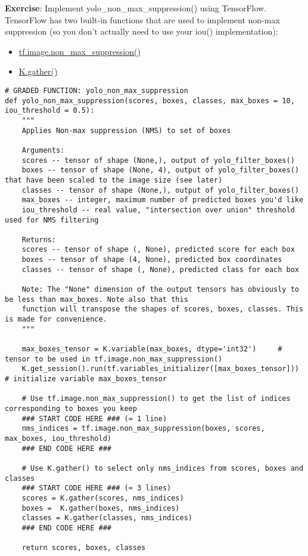 {\textbf{Exercise}}: Implement yolo\_non\_max\_suppression() using TensorFlow. TensorFlow has two built-in functions that are used to implement non-max suppression (so you don't actually need to use your iou() implementation):
\begin{itemize}
\item \href{https://www.tensorflow.org/api_docs/python/tf/image/non_max_suppression}{tf.image.non\_max\_suppression()}
\item \href{https://www.tensorflow.org/api_docs/python/tf/gather}{K.gather()}
\end{itemize}

\begin{verbatim}
# GRADED FUNCTION: yolo_non_max_suppression
def yolo_non_max_suppression(scores, boxes, classes, max_boxes = 10, iou_threshold = 0.5):
    """
    Applies Non-max suppression (NMS) to set of boxes
    
    Arguments:
    scores -- tensor of shape (None,), output of yolo_filter_boxes()
    boxes -- tensor of shape (None, 4), output of yolo_filter_boxes() that have been scaled to the image size (see later)
    classes -- tensor of shape (None,), output of yolo_filter_boxes()
    max_boxes -- integer, maximum number of predicted boxes you'd like
    iou_threshold -- real value, "intersection over union" threshold used for NMS filtering
    
    Returns:
    scores -- tensor of shape (, None), predicted score for each box
    boxes -- tensor of shape (4, None), predicted box coordinates
    classes -- tensor of shape (, None), predicted class for each box
    
    Note: The "None" dimension of the output tensors has obviously to be less than max_boxes. Note also that this
    function will transpose the shapes of scores, boxes, classes. This is made for convenience.
    """
    
    max_boxes_tensor = K.variable(max_boxes, dtype='int32')     # tensor to be used in tf.image.non_max_suppression()
    K.get_session().run(tf.variables_initializer([max_boxes_tensor])) # initialize variable max_boxes_tensor
    
    # Use tf.image.non_max_suppression() to get the list of indices corresponding to boxes you keep
    ### START CODE HERE ### (≈ 1 line)
    nms_indices = tf.image.non_max_suppression(boxes, scores, max_boxes, iou_threshold)
    ### END CODE HERE ###
    
    # Use K.gather() to select only nms_indices from scores, boxes and classes
    ### START CODE HERE ### (≈ 3 lines)
    scores = K.gather(scores, nms_indices)
    boxes =  K.gather(boxes, nms_indices)
    classes = K.gather(classes, nms_indices)
    ### END CODE HERE ###
    
    return scores, boxes, classes
\end{verbatim}






